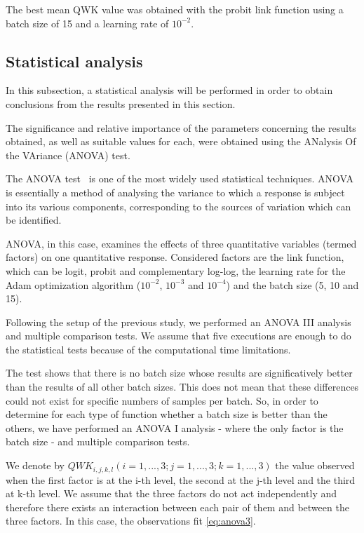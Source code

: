 \documentclass[journal]{IEEEtran}
\begin{document}
	The best mean QWK value was obtained with the probit link function using a batch size of 15 and a learning rate of $10^{-2}$.
	
	\subsection{Statistical analysis}
	\label{sect:statisticalanalysis}
	In this subsection, a statistical analysis will be performed in order to obtain conclusions from the results presented in this section.
	
	The significance and relative importance of the parameters concerning the results obtained, as well as suitable values for each, were obtained using the ANalysis Of the VAriance (ANOVA) test.
	
	The ANOVA test~\cite{miller1997beyond} is one of the most widely used statistical techniques. ANOVA is essentially a method of analysing the variance to which a response is subject into its various components, corresponding to the sources of variation which can be identified.
	
	ANOVA, in this case, examines the effects of three quantitative variables (termed factors) on one quantitative response. Considered factors are the link function, which can be logit, probit and complementary log-log, the learning rate for the Adam optimization algorithm ($10^{-2}$, $10^{-3}$ and $10^{-4}$) and the batch size (5, 10 and 15).
	
	Following the setup of the previous study, we performed an ANOVA III analysis and multiple comparison tests. We assume that five executions are enough to do the statistical tests because of the computational time limitations.
	
	The test shows that there is no batch size whose results are significatively better than the results of all other batch sizes. This does not mean that these differences could not exist for specific numbers of samples per batch. So, in order to determine for each type of function whether a batch size is better than the others, we have performed an ANOVA I analysis - where the only factor is the batch size - and multiple comparison tests.
	
	We denote by $QWK_{i,j,k,l}(i=1, ..., 3; j = 1, ..., 3; k = 1, ..., 3)$ the value observed when the first factor is at the i-th level, the second at the j-th level and the third at k-th level. We assume that the three factors do not act independently and therefore there exists an interaction between each pair of them and between the three factors. In this case, the observations fit \ref{eq:anova3}.
	
\end{document}
